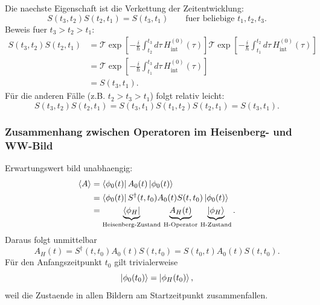 Die naechste Eigenschaft ist die Verkettung der
Zeitentwicklung:
\begin{equation}
  S(t_3,t_2)S(t_2,t_1)=S(t_3,t_1)
  \qquad \text{fuer beliebige } t_1,t_2,t_3.
\end{equation}
Beweis fuer $t_3>t_2>t_1$:
\begin{equation}
  \begin{aligned}
    S(t_3,t_2)S(t_2,t_1)
     & = \mathcal T\exp\!\left[-\frac{i}{\hbar}\int_{t_2}^{t_3}d\tau\,H_{\mathrm{int}}^{(0)}(\tau)\right]
    \mathcal T\exp\!\left[-\frac{i}{\hbar}\int_{t_1}^{t_2}d\tau\,H_{\mathrm{int}}^{(0)}(\tau)\right]      \\
     & = \mathcal T\exp\!\left[-\frac{i}{\hbar}\int_{t_1}^{t_3}d\tau\,H_{\mathrm{int}}^{(0)}(\tau)\right] \\
     & = S(t_3,t_1).
  \end{aligned}
\end{equation}
Für die anderen Fälle (z.B. $t_2>t_3>t_1$) folgt relativ leicht:
\begin{equation}
  S(t_3,t_2)S(t_2,t_1) = S(t_3,t_1)S(t_1,t_2)S(t_2,t_1) = S(t_3,t_1).
\end{equation}

\subsubsection*{Zusammenhang zwischen Operatoren im Heisenberg- und WW-Bild}

Erwartungswert bild unabhaengig:
\begin{equation}
  \begin{aligned}
    \left\langle A\right\rangle
     & = \left\langle\phi_0(t)\right|A_0(t)\left|\phi_0(t)\right\rangle                           \\
     & = \left\langle\phi_0(t)\right|S^{\dagger}(t,t_0)A_0(t)S(t,t_0)\left|\phi_0(t)\right\rangle \\
     & = \underbrace{\left\langle\phi_H\right|}_{\text{Heisenberg-Zustand}}
    \,\underbrace{A_H(t)}_{\text{H-Operator}}
    \,\underbrace{\left|\phi_H\right\rangle}_{\text{H-Zustand}}.
  \end{aligned}
\end{equation}
Daraus folgt unmittelbar
\begin{equation}
  A_H(t)=S^{\dagger}(t,t_0)A_0(t)S(t,t_0)=S(t_0,t)A_0(t)S(t,t_0).
\end{equation}
Für den Anfangszeitpunkt $t_0$ gilt trivialerweise
\begin{equation}
  \left|\phi_0(t_0)\right\rangle=\left|\phi_H(t_0)\right\rangle,
\end{equation}
weil die Zustaende in allen Bildern am Startzeitpunkt zusammenfallen.

